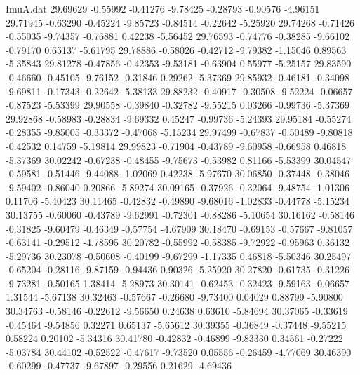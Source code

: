 \begin{filecontents}{ImuA.dat}
  29.69629   -0.55992   -0.41276   -9.78425   -0.28793   -0.90576   -4.96151
  29.71945   -0.63290   -0.45224   -9.85723   -0.84514   -0.22642   -5.25920
  29.74268   -0.71426   -0.55035   -9.74357   -0.76881    0.42238   -5.56452
  29.76593   -0.74776   -0.38285   -9.66102   -0.79170    0.65137   -5.61795
  29.78886   -0.58026   -0.42712   -9.79382   -1.15046    0.89563   -5.35843
  29.81278   -0.47856   -0.42353   -9.53181   -0.63904    0.55977   -5.25157
  29.83590   -0.46660   -0.45105   -9.76152   -0.31846    0.29262   -5.37369
  29.85932   -0.46181   -0.34098   -9.69811   -0.17343   -0.22642   -5.38133
  29.88232   -0.40917   -0.30508   -9.52224   -0.06657   -0.87523   -5.53399
  29.90558   -0.39840   -0.32782   -9.55215    0.03266   -0.99736   -5.37369
  29.92868   -0.58983   -0.28834   -9.69332    0.45247   -0.99736   -5.24393
  29.95184   -0.55274   -0.28355   -9.85005   -0.33372   -0.47068   -5.15234
  29.97499   -0.67837   -0.50489   -9.80818   -0.42532    0.14759   -5.19814
  29.99823   -0.71904   -0.43789   -9.60958   -0.66958    0.46818   -5.37369
  30.02242   -0.67238   -0.48455   -9.75673   -0.53982    0.81166   -5.53399
  30.04547   -0.59581   -0.51446   -9.44088   -1.02069    0.42238   -5.97670
  30.06850   -0.37448   -0.38046   -9.59402   -0.86040    0.20866   -5.89274
  30.09165   -0.37926   -0.32064   -9.48754   -1.01306    0.11706   -5.40423
  30.11465   -0.42832   -0.49890   -9.68016   -1.02833   -0.44778   -5.15234
  30.13755   -0.60060   -0.43789   -9.62991   -0.72301   -0.88286   -5.10654
  30.16162   -0.58146   -0.31825   -9.60479   -0.46349   -0.57754   -4.67909
  30.18470   -0.69153   -0.57667   -9.81057   -0.63141   -0.29512   -4.78595
  30.20782   -0.55992   -0.58385   -9.72922   -0.95963    0.36132   -5.29736
  30.23078   -0.50608   -0.40199   -9.67299   -1.17335    0.46818   -5.50346
  30.25497   -0.65204   -0.28116   -9.87159   -0.94436    0.90326   -5.25920
  30.27820   -0.61735   -0.31226   -9.73281   -0.50165    1.38414   -5.28973
  30.30141   -0.62453   -0.32423   -9.59163   -0.06657    1.31544   -5.67138
  30.32463   -0.57667   -0.26680   -9.73400    0.04029    0.88799   -5.90800
  30.34763   -0.58146   -0.22612   -9.56650    0.24638    0.63610   -5.84694
  30.37065   -0.33619   -0.45464   -9.54856    0.32271    0.65137   -5.65612
  30.39355   -0.36849   -0.37448   -9.55215    0.58224    0.20102   -5.34316
  30.41780   -0.42832   -0.46899   -9.83330    0.34561   -0.27222   -5.03784
  30.44102   -0.52522   -0.47617   -9.73520    0.05556   -0.26459   -4.77069
  30.46390   -0.60299   -0.47737   -9.67897   -0.29556    0.21629   -4.69436

\end{filecontents}
